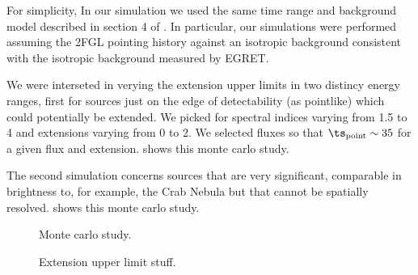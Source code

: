 For simplicity, In our simulation we used the same time range and background model described in section 
4 of \cite{extended_source_serach}. In particular, our simulations were performed assuming the 2FGL
pointing history against an isotropic background consistent with the 
isotropic background measured by EGRET.

We were interseted in verying the extension upper limits in two distincy energy ranges, first
for sources just on the edge of detectability (as pointlike) which could potentially be extended.
We picked for spectral indices varying from 1.5 to 4 and extensions varying from 0 to 2.
We selected fluxes so that $\ts_\text{point} \sim 35$ for a given flux and extension.
 shows this monte carlo study.

The second simulation concerns sources that are very significant, comparable in brightness to, for example,
the Crab Nebula but that cannot be spatially resolved.
 shows this monte carlo study.

\begin{figure}
  \ifdefined\bwfigures
  \else
  \fi
  \caption{Monte carlo study.}
\label{fig:extul_dim}
\end{figure}


\begin{figure}
  \ifdefined\bwfigures
  \else
  \fi
  \caption{Extension upper limit stuff.}
\label{fig:extul_bright}
\end{figure}
